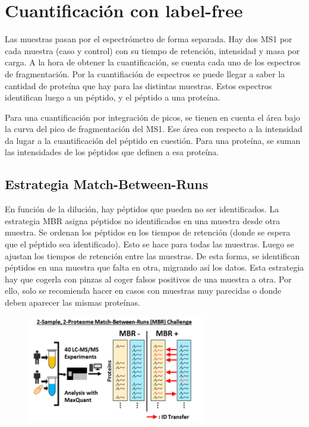\section{Cuantificación con label-free}
Las muestras pasan por el espectrómetro de forma separada. Hay dos MS1 por cada muestra (caso y control) con su tiempo de retención, intensidad y masa por carga. A la hora de obtener la cuantificación, se cuenta cada uno de los espectros de fragmentación. Por la cuantifiación de espectros se puede llegar a saber la cantidad de proteína que hay para las distintas muestras. Estos espectros identifican luego a un péptido, y el péptido a una proteína. 

Para una cuantificación por integración de picos, se tienen en cuenta el área bajo la curva del pico de fragmentación del MS1. Ese área con respecto a la intensidad da lugar a la cuantificación del péptido en cuestión.
Para una proteína, se suman las intensidades de los péptidos que definen a esa proteína.

\subsection{Estrategia Match-Between-Runs}
En función de la dilución, hay péptidos que pueden no ser identificados. La estrategia MBR asigna péptidos no identificados en una muestra desde otra muestra. Se ordenan los péptidos en los tiempos de retención (donde se espera que el péptido sea identificado). Esto se hace para todas las muestras. Luego se ajustan los tiempos de retención entre las muestras. De esta forma, se identifican péptidos en una muestra que falta en otra, migrando así los datos. Esta estrategia hay que cogerla con pinzas al coger falsos positivos de una muestra a otra. Por ello, solo se recomienda hacer en casos con muestras muy parecidas o donde deben aparecer las mismas proteínas. 

\begin{figure}[h]
\centering
\includegraphics[width = 0.7\textwidth]{figs/mbr.png}
\end{figure}

